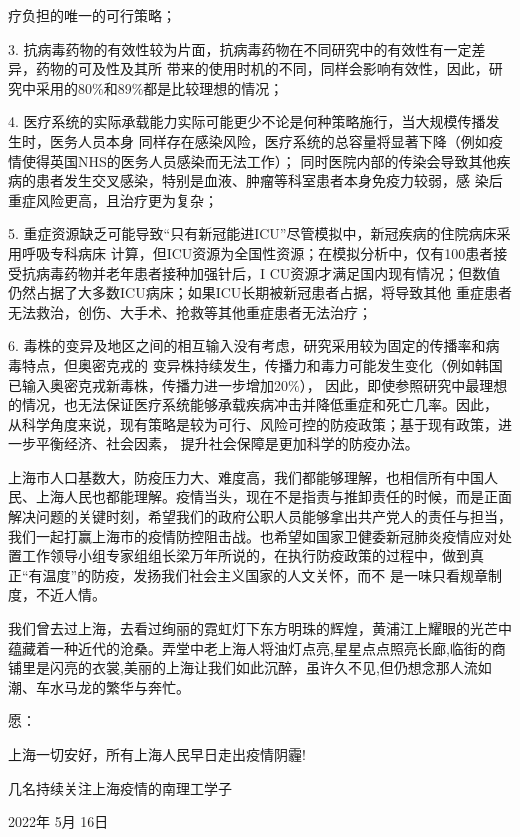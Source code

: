 \documentclass[bwprint]{gmcmthesis}
\numberwithin{figure}{section}
\begin{document}
疗负担的唯一的可行策略；
\par 3. 抗病毒药物的有效性较为片面，抗病毒药物在不同研究中的有效性有一定差异，药物的可及性及其所
带来的使用时机的不同，同样会影响有效性，因此，研究中采用的80$\%$和89$\%$都是比较理想的情况；
\par 4. 医疗系统的实际承载能力实际可能更少不论是何种策略施行，当大规模传播发生时，医务人员本身
同样存在感染风险，医疗系统的总容量将显著下降（例如疫情使得英国NHS的医务人员感染而无法工作）；
同时医院内部的传染会导致其他疾病的患者发生交叉感染，特别是血液、肿瘤等科室患者本身免疫力较弱，感
染后重症风险更高，且治疗更为复杂；
\par 5. 重症资源缺乏可能导致“只有新冠能进ICU”尽管模拟中，新冠疾病的住院病床采用呼吸专科病床
计算，但ICU资源为全国性资源；在模拟分析中，仅有100患者接受抗病毒药物并老年患者接种加强针后，I
CU资源才满足国内现有情况；但数值仍然占据了大多数ICU病床；如果ICU长期被新冠患者占据，将导致其他
重症患者无法救治，创伤、大手术、抢救等其他重症患者无法治疗；
\par 6. 毒株的变异及地区之间的相互输入没有考虑，研究采用较为固定的传播率和病毒特点，但奥密克戎的
变异株持续发生，传播力和毒力可能发生变化（例如韩国已输入奥密克戎新毒株，传播力进一步增加20$\%$），
因此，即使参照研究中最理想的情况，也无法保证医疗系统能够承载疾病冲击并降低重症和死亡几率。因此，
从科学角度来说，现有策略是较为可行、风险可控的防疫政策；基于现有政策，进一步平衡经济、社会因素，
提升社会保障是更加科学的防疫办法。
\par 上海市人口基数大，防疫压力大、难度高，我们都能够理解，也相信所有中国人民、上海人民也都能理解。疫情当头，现在不是指责与推卸责任的时候，而是正面解决问题的关键时刻，希望我们的政府公职人员能够拿出共产党人的责任与担当，我们一起打赢上海市的疫情防控阻击战。也希望如国家卫健委新冠肺炎疫情应对处置工作领导小组专家组组长梁万年所说的，在执行防疫政策的过程中，做到真正“有温度”的防疫，发扬我们社会主义国家的人文关怀，而不
是一味只看规章制度，不近人情。
\par 我们曾去过上海，去看过绚丽的霓虹灯下东方明珠的辉煌，黄浦江上耀眼的光芒中蕴藏着一种近代的沧桑。弄堂中老上海人将油灯点亮,星星点点照亮长廊,临街的商铺里是闪亮的衣裳,美丽的上海让我们如此沉醉，虽许久不见,但仍想念那人流如潮、车水马龙的繁华与奔忙。
\\
\par 愿：
\begin{flushleft}
    上海一切安好，所有上海人民早日走出疫情阴霾!
\end{flushleft}
\begin{flushright}
    几名持续关注上海疫情的南理工学子
    \par 2022年 5月 16日
\end{flushright}
\end{document}
